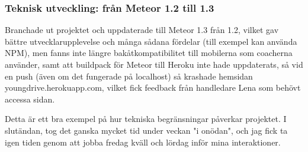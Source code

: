 \subsubsection{Teknisk utveckling: från Meteor 1.2 till 1.3}
Branchade ut projektet och uppdaterade till Meteor 1.3 från 1.2, vilket gav bättre utvecklarupplevelse och många sådana fördelar (till exempel kan använda NPM), men fanns inte längre bakåtkompatibilitet till mobilerna som coacherna använder, samt att buildpack för Meteor till Heroku inte hade uppdaterats, så vid en push (även om det fungerade på localhost) så krashade hemsidan youngdrive.herokuapp.com, vilket fick feedback från handledare Lena som behövt accessa sidan.

Detta är ett bra exempel på hur tekniska begränsningar påverkar projektet. I slutändan, tog det ganska mycket tid under veckan "i onödan", och jag fick ta igen tiden genom att jobba fredag kväll och lördag inför mina interaktioner.
